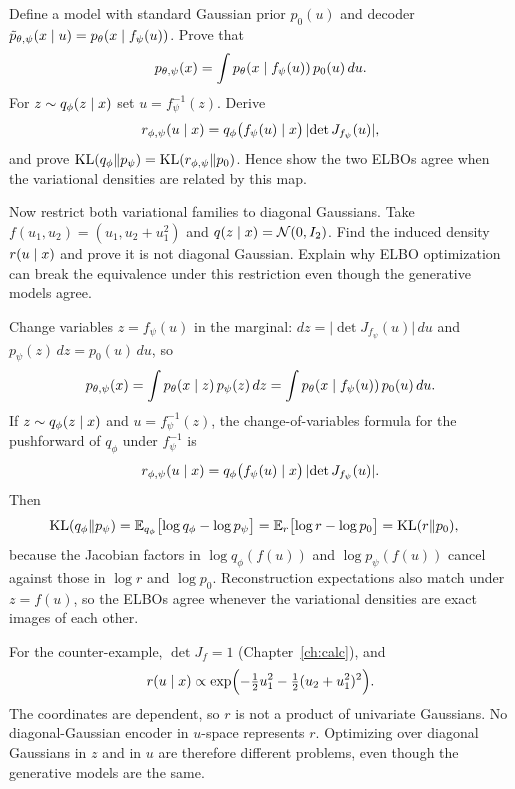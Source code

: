 \begin{hwqbox}
Define a model with standard Gaussian prior $p_0(u)$ and decoder
$\tilde p_{\theta,\psi}(x\mid u)=p_\theta(x\mid f_\psi(u))$. Prove that
\[
p_{\theta,\psi}(x)=\int p_\theta(x\mid f_\psi(u))\,p_0(u)\,du.
\]
For $z\sim q_\phi(z\mid x)$ set $u=f_\psi^{-1}(z)$. Derive
\[
r_{\phi,\psi}(u\mid x)=q_\phi\bigl(f_\psi(u)\mid x\bigr)\,\lvert\det J_{f_\psi}(u)\rvert,
\]
and prove $\mathrm{KL}(q_\phi\Vert p_\psi)=\mathrm{KL}(r_{\phi,\psi}\Vert p_0)$. Hence show the two ELBOs agree when the variational densities are related by this map.

Now restrict both variational families to diagonal Gaussians. Take
$f(u_1,u_2)=(u_1,u_2+u_1^2)$ and $q(z\mid x)=\mathcal{N}(0,I_2)$. Find the induced density $r(u\mid x)$ and prove it is not diagonal Gaussian. Explain why ELBO optimization can break the equivalence under this restriction even though the generative models agree.
\end{hwqbox}
\begin{hwsolbox}
Change variables $z=f_\psi(u)$ in the marginal: $dz=\lvert\det J_{f_\psi}(u)\rvert\,du$ and
$p_\psi(z)\,dz=p_0(u)\,du$, so
\[
p_{\theta,\psi}(x)
=\int p_\theta(x\mid z)\,p_\psi(z)\,dz
=\int p_\theta(x\mid f_\psi(u))\,p_0(u)\,du.
\]
If $z\sim q_\phi(z\mid x)$ and $u=f_\psi^{-1}(z)$, the change-of-variables formula for the pushforward of $q_\phi$ under $f_\psi^{-1}$ is
\[
r_{\phi,\psi}(u\mid x)
=q_\phi\bigl(f_\psi(u)\mid x\bigr)\,\lvert\det J_{f_\psi}(u)\rvert.
\]
Then
\begin{align*}
\mathrm{KL}(q_\phi\Vert p_\psi)
&=\mathbb{E}_{q_\phi}\bigl[\log q_\phi-\log p_\psi\bigr]
=\mathbb{E}_{r}\bigl[\log r-\log p_0\bigr]
=\mathrm{KL}(r\Vert p_0),
\end{align*}
because the Jacobian factors in $\log q_\phi(f(u))$ and $\log p_\psi(f(u))$ cancel against those in $\log r$ and $\log p_0$. Reconstruction expectations also match under $z=f(u)$, so the ELBOs agree whenever the variational densities are exact images of each other.

For the counter-example, $\det J_f=1$ (Chapter~\ref{ch:calc}), and
\[
r(u\mid x)\propto\exp\Bigl(-\tfrac12 u_1^2-\tfrac12(u_2+u_1^2)^2\Bigr).
\]
The coordinates are dependent, so $r$ is not a product of univariate Gaussians. No diagonal-Gaussian encoder in $u$-space represents $r$. Optimizing over diagonal Gaussians in $z$ and in $u$ are therefore different problems, even though the generative models are the same.
\end{hwsolbox}

